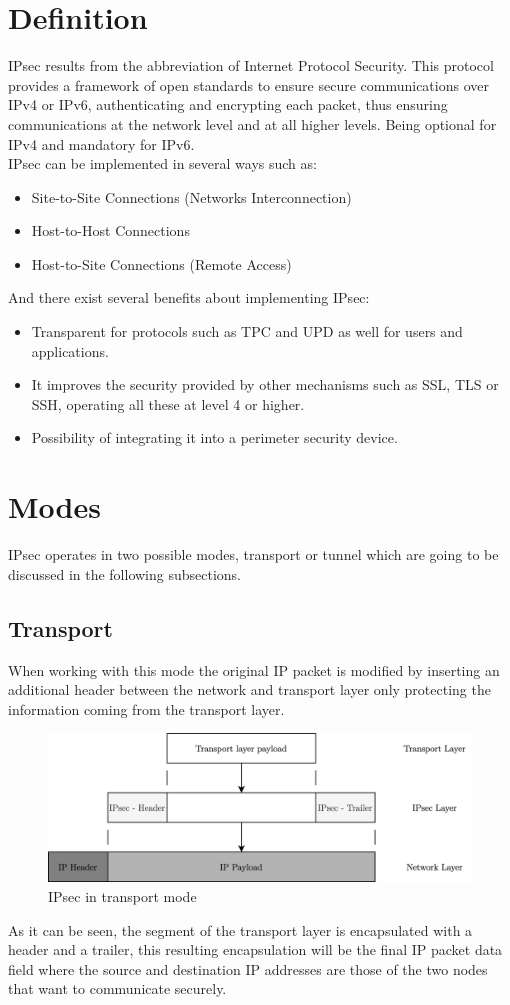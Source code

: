 \documentclass[11pt]{book}
\begin{document}
\section{Definition}
IPsec results from the abbreviation of Internet Protocol Security. This protocol provides a framework of open standards to ensure secure communications over IPv4 or IPv6, authenticating and encrypting each packet, thus ensuring communications at the network level and at all higher levels. Being optional for IPv4 and mandatory for IPv6.\\
IPsec can be implemented in several ways such as:
\begin{itemize}
\item Site-to-Site Connections (Networks Interconnection)
\item Host-to-Host Connections
\item Host-to-Site Connections (Remote Access)
\end{itemize}
And there exist several benefits about implementing IPsec:
\begin{itemize}
\item Transparent for protocols such as TPC and UPD as well for users and applications.
\item It improves the security provided by other mechanisms such as SSL, TLS or SSH, operating all these at level 4 or higher.
\item Possibility of integrating it into a perimeter security device.
\end{itemize}


\section{Modes}
IPsec operates in two possible modes, transport or tunnel which are going to be discussed in the following subsections.
\subsection{Transport}
When working with this mode the original IP packet is modified by inserting an additional header between the network and transport layer only protecting the information coming from the transport layer. 
\begin{figure}[H]
	\centering
	\includegraphics [scale=0.165] {transport_encapsulation.png}
	\caption{IPsec in transport mode}
\end{figure}
As it can be seen, the segment of the transport layer is encapsulated with a header and a trailer, this resulting encapsulation will be the final IP packet data field where the source and destination IP addresses are those of the two nodes that want to communicate securely.\\
\end{document}
